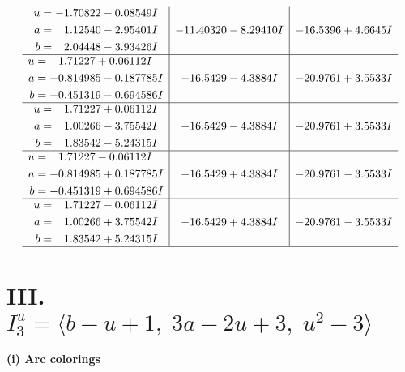 \documentclass[1p]{elsarticle_modified}
\theoremstyle{definition}
\begin{document}
$$\begin{array}{c|c|c}
\begin{aligned}
u &= -1.70822 - 0.08549 I \\
a &= \phantom{-}1.12540 - 2.95401 I \\
b &= \phantom{-}2.04448 - 3.93426 I\end{aligned}
 & -11.40320 - 8.29410 I & -16.5396 + 4.6645 I \\ \hline\begin{aligned}
u &= \phantom{-}1.71227 + 0.06112 I \\
a &= -0.814985 - 0.187785 I \\
b &= -0.451319 - 0.694586 I\end{aligned}
 & -16.5429 - 4.3884 I & -20.9761 + 3.5533 I \\ \hline\begin{aligned}
u &= \phantom{-}1.71227 + 0.06112 I \\
a &= \phantom{-}1.00266 - 3.75542 I \\
b &= \phantom{-}1.83542 - 5.24315 I\end{aligned}
 & -16.5429 - 4.3884 I & -20.9761 + 3.5533 I \\ \hline\begin{aligned}
u &= \phantom{-}1.71227 - 0.06112 I \\
a &= -0.814985 + 0.187785 I \\
b &= -0.451319 + 0.694586 I\end{aligned}
 & -16.5429 + 4.3884 I & -20.9761 - 3.5533 I \\ \hline\begin{aligned}
u &= \phantom{-}1.71227 - 0.06112 I \\
a &= \phantom{-}1.00266 + 3.75542 I \\
b &= \phantom{-}1.83542 + 5.24315 I\end{aligned}
 & -16.5429 + 4.3884 I & -20.9761 - 3.5533 I\\
 \hline 
 \end{array}$$\newpage\newpage\renewcommand{\arraystretch}{1}
\centering \section*{III. $I^u_{3}= \langle b- u+1,\;3 a-2 u+3,\;u^2-3 \rangle$}
\flushleft \textbf{(i) Arc colorings}\\
\end{document}
